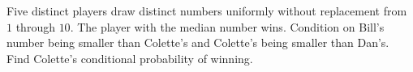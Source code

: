 Five distinct players draw distinct numbers uniformly without replacement from $1$ through $10$. The player with the median number wins. Condition on Bill's number being smaller than Colette's and Colette's being smaller than Dan's. Find Colette's conditional probability of winning.
